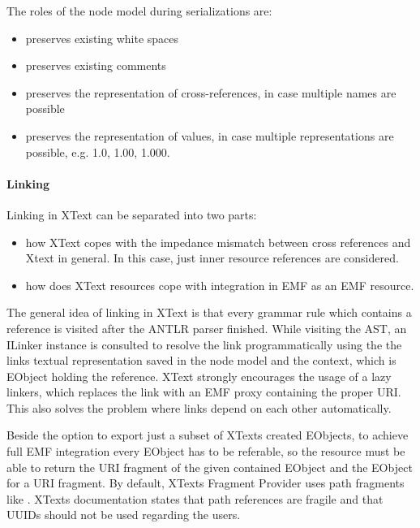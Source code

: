 The roles of the node model during serializations are:
\begin{itemize}
	\item preserves existing white spaces
	\item preserves existing comments
	\item preserves the representation of cross-references, in case multiple names are possible
	\item preserves the representation of values, in case multiple representations are possible, e.g. 1.0, 1.00, 1.000.
\end{itemize}

\paragraph{Linking}
\label{sec:xtextarch:Linking}
Linking in XText can be separated into two parts:
\begin{itemize}
	\item how XText copes with the impedance mismatch between cross references and Xtext in general. In this case, just inner resource references are considered. 
	\item how does XText resources cope with integration in EMF as an EMF resource.
\end{itemize}
The general idea of linking in XText is that every grammar rule which contains a reference is visited after the ANTLR parser finished. While visiting the AST, an ILinker instance is consulted to resolve the link programmatically using the the links textual representation saved in the node model and the context, which is EObject holding the reference. XText strongly encourages the usage of a lazy linkers, which replaces the link with an EMF proxy containing the proper URI. This also solves the problem where links depend on each other automatically.

Beside the option to export just a subset of XTexts created EObjects, to achieve full EMF integration every EObject has to be referable, so the resource must be able to return the URI fragment of the given contained EObject and the EObject for a URI fragment. By default, XTexts Fragment Provider  uses path fragments like . XTexts documentation states that path references are fragile and that UUIDs should not be used regarding the users. 


